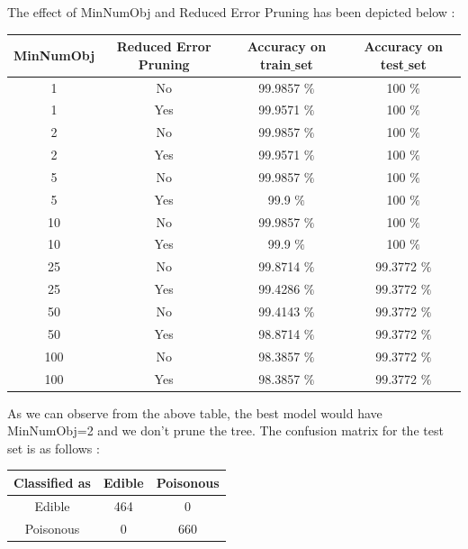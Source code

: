 \documentclass[paper=a4, fontsize=11pt]{scrartcl}
\numberwithin{equation}{section}		%
\numberwithin{figure}{section}			%
\numberwithin{table}{section}				%
\begin{document}
The effect of MinNumObj and Reduced Error Pruning has been depicted below : \\
\begin{table}[H]
\label{T:equipos}
\begin{center}
\begin{tabular}{| c | c | c | c |}
\hline
\textbf{MinNumObj} & \textbf{Reduced Error Pruning} & \textbf{Accuracy on train$\_$set} & \textbf{Accuracy on test$\_$set} \\ 
\hline

1 & No  & 99.9857 $\%$ & 100 $\%$ \\ \hline
1 & Yes  & 99.9571 $\%$ & 100 $\%$ \\ \hline
2 & No  & 99.9857 $\%$ & 100 $\%$ \\ \hline
2 & Yes & 99.9571 $\%$ & 100 $\%$ \\ \hline
5 & No & 99.9857 $\%$ & 100 $\%$ \\ \hline
5 & Yes & 99.9 $\%$ & 100 $\%$ \\ \hline
10 & No & 99.9857 $\%$ & 100 $\%$ \\ \hline
10 & Yes & 99.9 $\%$ & 100 $\%$ \\ \hline
25 & No & 99.8714 $\%$ & 99.3772 $\%$ \\ \hline
25 & Yes & 99.4286 $\%$ & 99.3772 $\%$ \\ \hline
50 & No & 99.4143 $\%$ & 99.3772 $\%$ \\ \hline
50 & Yes & 98.8714 $\%$ & 99.3772 $\%$ \\ \hline
100 & No & 98.3857 $\%$ & 99.3772 $\%$ \\ \hline
100 & Yes & 98.3857 $\%$ & 99.3772 $\%$ \\ \hline 


\end{tabular}
\end{center}
\end{table}

As we can observe from the above table, the best model would have MinNumObj=2 and we don't prune the tree. The confusion matrix for the test set is as follows :\\
\begin{table}[H]
\label{T:equipos}
\begin{center}
\begin{tabular}{| c | c | c |}
\hline
\textbf{Classified as} & \textbf{Edible} & \textbf{Poisonous} \\ 
\hline

Edible & 464  & 0 \\ \hline
Poisonous & 0 & 660 \\ \hline

\end{tabular}
\end{center}
\end{table}
\end{document}
